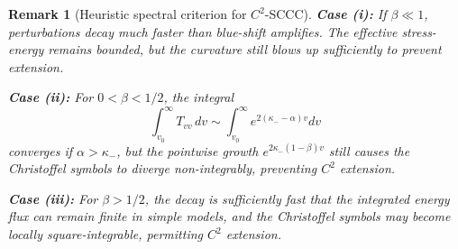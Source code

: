 \documentclass[12pt,a4paper]{article}
\newtheorem{remark}[theorem]{Remark}
\begin{document}
\begin{remark}[Heuristic spectral criterion for $C^2$-SCCC]
\textbf{Case (i):} If $\beta \ll 1$, perturbations decay much faster than blue-shift amplifies. The effective stress-energy remains bounded, but the curvature still blows up sufficiently to prevent extension.

\textbf{Case (ii):} For $0 < \beta < 1/2$, the integral
\begin{equation}
\int_{v_0}^{\infty} T_{vv} \, dv \sim \int_{v_0}^{\infty} e^{2(\kappa_- - \alpha)v} dv
\end{equation}
converges if $\alpha > \kappa_-$, but the pointwise growth $e^{2\kappa_-(1-\beta)v}$ still causes the Christoffel symbols to diverge non-integrably, preventing $C^2$ extension.

\textbf{Case (iii):} For $\beta > 1/2$, the decay is sufficiently fast that the integrated energy flux can remain finite in simple models, and the Christoffel symbols may become locally square-integrable, permitting $C^2$ extension.
\end{remark}
\end{document}
